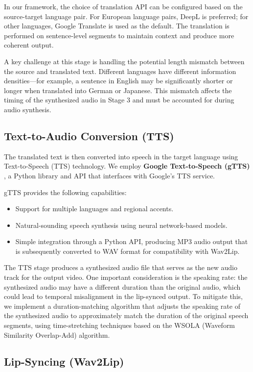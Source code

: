\documentclass[conference]{IEEEtran}
\begin{document}
In our framework, the choice of translation API can be configured based on the source-target language pair. For European language pairs, DeepL is preferred; for other languages, Google Translate is used as the default. The translation is performed on sentence-level segments to maintain context and produce more coherent output.

A key challenge at this stage is handling the potential length mismatch between the source and translated text. Different languages have different information densities---for example, a sentence in English may be significantly shorter or longer when translated into German or Japanese. This mismatch affects the timing of the synthesized audio in Stage 3 and must be accounted for during audio synthesis.

\subsection{Text-to-Audio Conversion (TTS)}

The translated text is then converted into speech in the target language using Text-to-Speech (TTS) technology. We employ \textbf{Google Text-to-Speech (gTTS)} \cite{b4}, a Python library and API that interfaces with Google's TTS service.

gTTS provides the following capabilities:
\begin{itemize}
    \item Support for multiple languages and regional accents.
    \item Natural-sounding speech synthesis using neural network-based models.
    \item Simple integration through a Python API, producing MP3 audio output that is subsequently converted to WAV format for compatibility with Wav2Lip.
\end{itemize}

The TTS stage produces a synthesized audio file that serves as the new audio track for the output video. One important consideration is the speaking rate: the synthesized audio may have a different duration than the original audio, which could lead to temporal misalignment in the lip-synced output. To mitigate this, we implement a duration-matching algorithm that adjusts the speaking rate of the synthesized audio to approximately match the duration of the original speech segments, using time-stretching techniques based on the WSOLA (Waveform Similarity Overlap-Add) algorithm.

\subsection{Lip-Syncing (Wav2Lip)}
\end{document}
